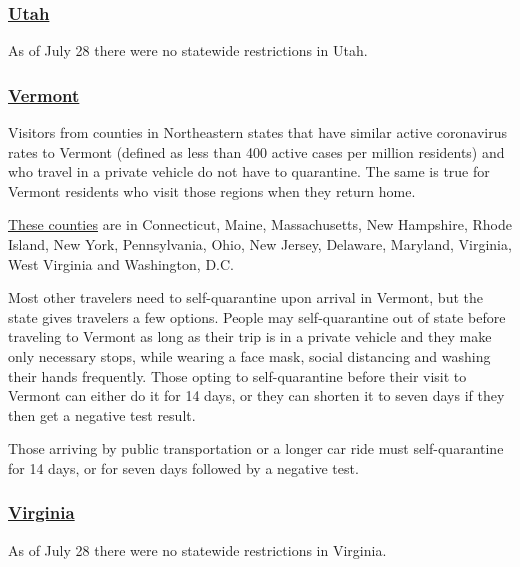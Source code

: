 \hypertarget{utah}{%
\subsubsection{\texorpdfstring{\href{https://www.visitutah.com/plan-your-trip/covid-19/}{Utah}}{Utah}}\label{utah}}

As of July 28 there were no statewide restrictions in Utah.

\hypertarget{vermont}{%
\subsubsection{\texorpdfstring{\href{https://www.healthvermont.gov/response/coronavirus-covid-19/traveling-vermont}{Vermont}}{Vermont}}\label{vermont}}

Visitors from counties in Northeastern states that have similar active
coronavirus rates to Vermont (defined as less than 400 active cases per
million residents) and who travel in a private vehicle do not have to
quarantine. The same is true for Vermont residents who visit those
regions when they return home.

\href{https://accd.vermont.gov/covid-19/restart/cross-state-travel}{These
counties} are in Connecticut, Maine, Massachusetts, New Hampshire, Rhode
Island, New York, Pennsylvania, Ohio, New Jersey, Delaware, Maryland,
Virginia, West Virginia and Washington, D.C.

Most other travelers need to self-quarantine upon arrival in Vermont,
but the state gives travelers a few options. People may self-quarantine
out of state before traveling to Vermont as long as their trip is in a
private vehicle and they make only necessary stops, while wearing a face
mask, social distancing and washing their hands frequently. Those opting
to self-quarantine before their visit to Vermont can either do it for 14
days, or they can shorten it to seven days if they then get a negative
test result.

Those arriving by public transportation or a longer car ride must
self-quarantine for 14 days, or for seven days followed by a negative
test.

\hypertarget{virginia}{%
\subsubsection{\texorpdfstring{\href{https://www.vdh.virginia.gov/coronavirus/frequently-asked-questions/u-s-travelers/}{Virginia}}{Virginia}}\label{virginia}}

As of July 28 there were no statewide restrictions in Virginia.

